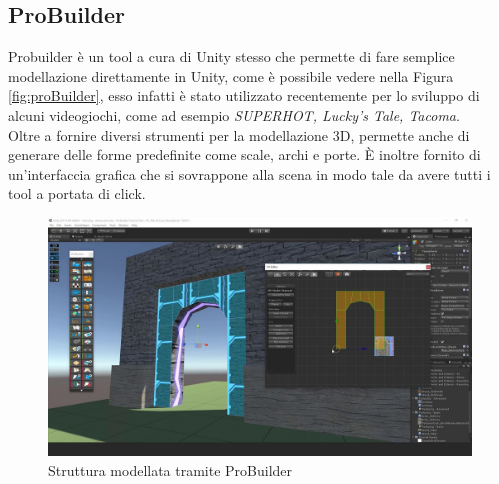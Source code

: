 \documentclass[12pt, openany]{book}
\begin{document}
	\subsection{ProBuilder}
	Probuilder è un tool a cura di Unity stesso che permette di fare semplice modellazione direttamente in Unity, come è possibile vedere nella Figura \ref{fig:proBuilder}, esso infatti è stato utilizzato recentemente per lo sviluppo di alcuni videogiochi, come ad esempio \emph{SUPERHOT, Lucky's Tale, Tacoma}.\\
	Oltre a fornire diversi strumenti per la modellazione 3D, permette anche di generare delle forme predefinite come scale, archi e porte. È inoltre fornito di un'interfaccia grafica che si sovrappone alla scena in modo tale da avere tutti i tool a portata di click.
		\begin{figure}[H]
		\centering
		\includegraphics[width=1\linewidth]{"Immagini/probuilder.jpg"}
		\caption{Struttura modellata tramite ProBuilder}
		\label{fig:probuilder}
	\end{figure}
\end{document}
